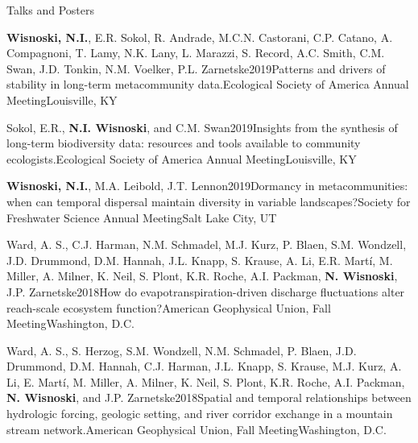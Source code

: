 \documentclass{resume} %
\begin{document}
\bigskip
\begin{rhangSection}{Talks and Posters}
  
    \begin{Presentation}{{\bf Wisnoski, N.I.}, E.R. Sokol, R. Andrade, M.C.N. Castorani, C.P. Catano, A. Compagnoni, T. Lamy, N.K. Lany, L. Marazzi, S. Record, A.C. Smith, C.M. Swan, J.D. Tonkin, N.M. Voelker, P.L. Zarnetske}{2019}{Patterns and drivers of stability in long-term metacommunity data.}{Ecological Society of America Annual Meeting}{Louisville, KY}
  \end{Presentation}
  
  \begin{Presentation}{Sokol, E.R., {\bf N.I. Wisnoski}, and C.M. Swan}{2019}{Insights from the synthesis of long-term biodiversity data: resources and tools available to community ecologists.}{Ecological Society of America Annual Meeting}{Louisville, KY}
  \end{Presentation}
  
   \begin{Presentation}{{\bf Wisnoski, N.I.}, M.A. Leibold, J.T. Lennon}{2019}{Dormancy in metacommunities: when can temporal dispersal maintain diversity in variable landscapes?}{Society for Freshwater Science Annual Meeting}{Salt Lake City, UT}
  \end{Presentation}
  
  \begin{Presentation}{Ward, A. S., C.J. Harman, N.M. Schmadel, M.J. Kurz, P. Blaen, S.M. Wondzell, J.D. Drummond, D.M. Hannah, J.L. Knapp, S. Krause, A. Li, E.R. Martí, M. Miller, A. Milner, K. Neil, S. Plont, K.R. Roche, A.I. Packman, {\bf N. Wisnoski}, J.P. Zarnetske}{2018}{How do evapotranspiration-driven discharge fluctuations alter reach-scale ecosystem function?}{American Geophysical Union, Fall Meeting}{Washington, D.C.}
  \end{Presentation}
  
   \begin{Presentation}{Ward, A. S., S. Herzog, S.M. Wondzell, N.M. Schmadel, P. Blaen, J.D. Drummond, D.M. Hannah, C.J. Harman, J.L. Knapp, S. Krause, M.J. Kurz, A. Li, E. Martí, M. Miller, A. Milner, K. Neil, S. Plont, K.R. Roche, A.I. Packman, {\bf N. Wisnoski}, and J.P. Zarnetske}{2018}{Spatial and temporal relationships between hydrologic forcing, geologic setting, and river corridor exchange in a mountain stream network.}{American Geophysical Union, Fall Meeting}{Washington, D.C.}
  \end{Presentation}
  

\end{rhangSection}
\end{document}
